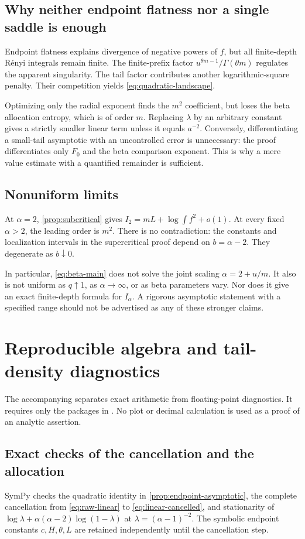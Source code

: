 \documentclass[11pt,a4paper]{article}
\numberwithin{equation}{section}
\theoremstyle{definition}\newaliascnt{definition}{theorem}
\theoremstyle{remark}\newaliascnt{remark}{theorem}
\begin{document}
\subsection{Why neither endpoint flatness nor a single saddle is enough}
Endpoint flatness explains divergence of negative powers of $f$, but all
finite-depth R\'enyi integrals remain finite. The finite-prefix factor
$u^{\theta m-1}/\Gamma(\theta m)$ regulates the apparent singularity.
The tail factor contributes another logarithmic-square penalty. Their
competition yields \eqref{eq:quadratic-landscape}.

Optimizing only the radial exponent finds the $m^2$ coefficient, but loses
the beta allocation entropy, which is of order $m$. Replacing
$\lambda$ by an arbitrary constant gives a strictly smaller linear term
unless it equals $a^{-2}$. Conversely, differentiating a small-tail
asymptotic with an uncontrolled error is unnecessary: the proof differentiates
only $F_0$ and the beta comparison exponent. This is why a mere value estimate
with a quantified remainder is sufficient.

\subsection{Nonuniform limits}
At $\alpha=2$, \cref{prop:subcritical} gives
$I_2=mL+\log\int f^2+o(1)$. At every fixed $\alpha>2$, the leading order is
$m^2$. There is no contradiction: the constants and localization intervals
in the supercritical proof depend on $b=\alpha-2$. They degenerate as
$b\downarrow0$.

In particular, \eqref{eq:beta-main} does not solve the joint scaling
$\alpha=2+u/m$. It also is not uniform as $q\uparrow1$, as
$\alpha\to\infty$, or as beta parameters vary. Nor does it give an exact
finite-depth formula for $I_\alpha$. A rigorous asymptotic statement with a
specified range should not be advertised as any of these stronger claims.

\section{Reproducible algebra and tail-density diagnostics}
\label{sec:computations}
The accompanying  separates exact arithmetic from
floating-point diagnostics. It requires only the packages in
. No plot or decimal calculation is used as a proof
of an analytic assertion.

\subsection{Exact checks of the cancellation and the allocation}
SymPy checks the quadratic identity in \cref{prop:endpoint-asymptotic},
the complete cancellation from \eqref{eq:raw-linear} to
\eqref{eq:linear-cancelled}, and stationarity of
$\log\lambda+\alpha(\alpha-2)\log(1-\lambda)$ at
$\lambda=(\alpha-1)^{-2}$. The symbolic endpoint constants $c,H,\theta,L$
are retained independently until the cancellation step.
\end{document}
